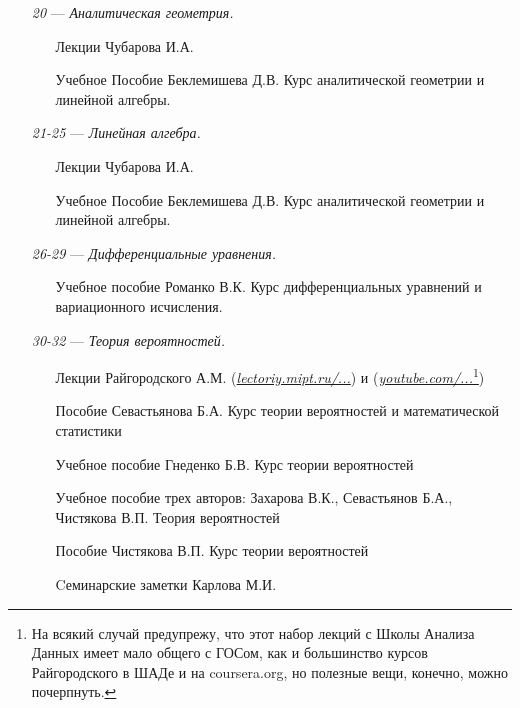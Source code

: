 \begin{itemize}
\newpage
\item[\textit{20}]
\; --- \: \textit{Аналитическая геометрия.}
\begin{itemize}
\item[\textbullet]
Лекции Чубарова И.А. 
\item[\textbullet]
Учебное Пособие Беклемишева Д.В. \glqq Курс аналитической геометрии и линейной алгебры\grqq.
\end{itemize}

\item[\textit{21-25}] 
\; --- \: \textit{Линейная алгебра.}
\begin{itemize}
\item[\textbullet]
Лекции Чубарова И.А. 
\item[\textbullet]
Учебное Пособие Беклемишева Д.В. \glqq Курс аналитической геометрии и линейной алгебры\grqq.
\end{itemize}

\item[\textit{26-29}] 
\; --- \: \textit{Дифференциальные уравнения.}
\begin{itemize}
\item[\textbullet] 
Учебное пособие Романко В.К. \glqq Курс дифференциальных уравнений и вариационного исчисления\grqq.
\end{itemize}

\item[\textit{30-32}]
\; --- \: \textit{Теория вероятностей.}
\begin{itemize}
\item[\textbullet]
Лекции Райгородского А.М. (\href{http://lectoriy.mipt.ru/course/Maths-ProbabilityTheoryBasics-L15}{\textit{lectoriy.mipt.ru/...}}) и (\href{https://www.youtube.com/playlist?list=PLJOzdkh8T5kouOIbZDCqzB72hBn9T7gsJ}{\textit{youtube.com/...}\footnote{На всякий случай предупрежу, что этот набор лекций с Школы Анализа Данных имеет мало общего с ГОСом, как и большинство курсов Райгородского в ШАДе и на coursera.org, но полезные вещи, конечно, можно почерпнуть.}})
\item[\textbullet]
Пособие Севастьянова Б.А. \glqq Курс теории вероятностей и математической статистики\grqq
\item[\textbullet]
Учебное пособие Гнеденко Б.В. \glqq Курс теории вероятностей\grqq
\item [\textbullet]
Учебное пособие трех авторов: Захарова В.К., Севастьянов Б.А., Чистякова В.П. \glqq Теория вероятностей\grqq
\item[\textbullet]
Пособие Чистякова В.П. \glqq Курс теории вероятностей\grqq
\item[\textbullet]
Cеминарские заметки Карлова М.И.
\end{itemize}


\end{itemize}
